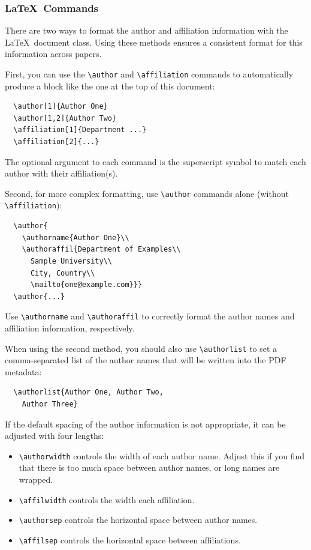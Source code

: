 \documentclass[preprint]{../latex/sigchi-modern}
\begin{document}
\subsubsection{\LaTeX\ Commands}
There are two ways to format the author and affiliation information  with the
\LaTeX\ document class. Using these methods ensures a consistent format for
this information across papers.

First, you can use the \texttt{\textbackslash author} and 
\texttt{\textbackslash affiliation} commands to automatically produce a block
like the one at the top of this document:
\begin{verbatim}
  \author[1]{Author One}
  \author[1,2]{Author Two}
  \affiliation[1]{Department ...}
  \affiliation[2]{...}
\end{verbatim}
The optional argument to each command is the superscript symbol to match each
author with their affiliation(s).

Second, for more complex formatting, use
\texttt{\textbackslash author} commands alone (without
\texttt{\textbackslash affiliation}):
\begin{verbatim}
  \author{
    \authorname{Author One}\\
    \authoraffil{Department of Examples\\
      Sample University\\
      City, Country\\
      \mailto{one@example.com}}}
  \author{...}
\end{verbatim}
Use \texttt{\textbackslash authorname} and \texttt{\textbackslash authoraffil}
to correctly format the author names and affiliation information, respectively.

When using the second method, you should also use
\texttt{\textbackslash author\-list} to set a comma-separated list of
the author names that will be written into the PDF metadata:
\begin{verbatim}
  \authorlist{Author One, Author Two, 
    Author Three}
\end{verbatim}

If the default spacing of the author information is not appropriate, it can be
adjusted with four lengths:
\begin{itemize}
  \item \texttt{\textbackslash authorwidth} controls the width of each author
    name.
    Adjust this if you find that there is too much space between author names,
    or long names are wrapped.
  \item \texttt{\textbackslash affilwidth} controls the width each affiliation.
  \item \texttt{\textbackslash authorsep} controls the horizontal space
    between author names.
  \item \texttt{\textbackslash affilsep} controls the horizontal space between
    affiliations.
\end{itemize}
\end{document}

